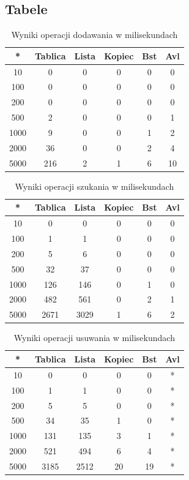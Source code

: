 \documentclass[a4paper, 11pt]{article}
\begin{document}
	
	\subsection{Tabele}
	
	\begin{table}[h!]
		\label{tab:dodawanie}
		\caption{Wyniki operacji dodawania w milisekundach}
		\begin{tabular}{c|c|c|c|c|c}
			*&Tablica&Lista&Kopiec&Bst&Avl\\ \hline
			10	&	0	&	0	&	0	&	0	&	0	\\
			100	&	0	&	0	&	0	&	0	&	0	\\
			200	&	0	&	0	&	0	&	0	&	0	\\
			500	&	2	&	0	&	0	&	0	&	1	\\
			1000	&	9	&	0	&	0	&	1	&	2	\\
			2000	&	36	&	0	&	0	&	2	&	4	\\
			5000	&	216	&	2	&	1	&	6	&	10	\\
			
		\end{tabular}
	\end{table}
	
	\begin{table}[h!]
		\label{tab:szukanie}
		\caption{Wyniki operacji szukania w milisekundach}
		\begin{tabular}{c|c|c|c|c|c}
			*&Tablica&Lista&Kopiec&Bst&Avl\\ \hline
			10	&	0	&	0	&	0	&	0	&	0	\\
			100	&	1	&	1	&	0	&	0	&	0	\\
			200	&	5	&	6	&	0	&	0	&	0	\\
			500	&	32	&	37	&	0	&	0	&	0	\\
			1000	&	126	&	146	&	0	&	1	&	0	\\
			2000	&	482	&	561	&	0	&	2	&	1	\\
			5000	&	2671	&	3029	&	1	&	6	&	2	\\
			
			
		\end{tabular}
	\end{table}
	
	\begin{table}[h!]
		\label{tab:usuwanie}
		\caption{Wyniki operacji usuwania w milisekundach}
		\begin{tabular}{c|c|c|c|c|c}
			*&Tablica&Lista&Kopiec&Bst&Avl\\ \hline
			10	&	0	&	0	&	0	&	0	&	*	\\
			100	&	1	&	1	&	0	&	0	&	*	\\
			200	&	5	&	5	&	0	&	0	&	*	\\
			500	&	34	&	35	&	1	&	0	&	*	\\
			1000	&	131	&	135	&	3	&	1	&	*	\\
			2000	&	521	&	494	&	6	&	4	&	*	\\
			5000	&	3185	&	2512	&	20	&	19	&	*	\\
			
		\end{tabular}
	\end{table}
	
\end{document}
